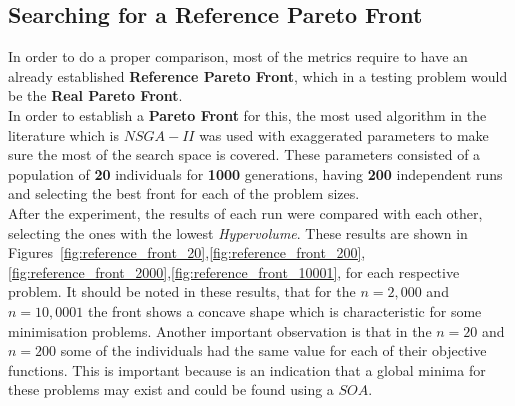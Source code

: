 \subsection{Searching for a Reference Pareto Front}

In order to do a proper comparison, most of the metrics require to have an already established \textbf{Reference Pareto Front}, which in a testing problem would be the \textbf{Real Pareto Front}. \\

In order to establish a \textbf{Pareto Front} for this, the most used algorithm in the literature which is $NSGA-II$ was used with exaggerated parameters to make sure the most of the search space is covered. These parameters consisted of a population of \textbf{20} individuals for \textbf{1000} generations, having \textbf{200} independent runs and selecting the best front for each of the problem sizes. \\

After the experiment, the results of each run were compared with each other, selecting the ones with the lowest \textit{Hypervolume}. These results are shown in Figures~\ref{fig:reference_front_20},\ref{fig:reference_front_200},\ref{fig:reference_front_2000},\ref{fig:reference_front_10001}, for each respective problem. It should be noted in these results, that for the $n=2,000$ and $n=10,0001$ the front shows a concave shape which is characteristic for some minimisation problems. Another important observation is that in the $n=20$ and $n=200$ some of the individuals had the same value for each of their objective functions. This is important because is an indication that a global minima for these problems may exist and could be found using a $SOA$.

